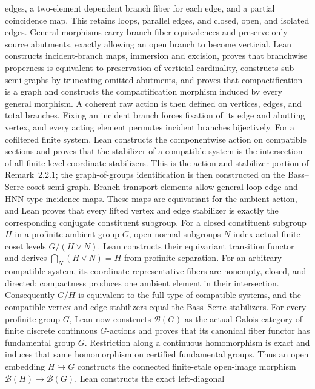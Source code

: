 \begin{definition}
  edges, a two-element dependent branch fiber for each edge, and a partial
  coincidence map.  This retains loops, parallel edges, and closed, open, and
  isolated edges.  General morphisms carry branch-fiber equivalences and
  preserve only source abutments, exactly allowing an open branch to become
  verticial.  Lean constructs incident-branch maps, immersion and excision,
  proves that branchwise properness is equivalent to preservation of verticial
  cardinality, constructs sub-semi-graphs by truncating omitted abutments, and
  proves that compactification is a graph and constructs the compactification
  morphism induced by every general morphism.
  A coherent raw action is then defined on vertices, edges, and total branches.
  Fixing an incident branch forces fixation of its edge and abutting vertex,
  and every acting element permutes incident branches bijectively.  For a
  cofiltered finite system, Lean constructs the componentwise action on
  compatible sections and proves that the stabilizer of a compatible system is
  the intersection of all finite-level coordinate stabilizers.  This is the
  action-and-stabilizer portion of Remark~2.2.1; the graph-of-groups
  identification is then constructed on the Bass--Serre coset semi-graph.
  Branch transport elements allow general loop-edge and HNN-type incidence
  maps.  These maps are equivariant for the ambient action, and Lean proves
  that every lifted vertex and edge stabilizer is exactly the corresponding
  conjugate constituent subgroup.  For a closed constituent subgroup $H$ in a
  profinite ambient group $G$, open normal subgroups $N$ index actual finite
  coset levels $G/(H\vee N)$.  Lean constructs their equivariant transition
  functor and derives $\bigcap_N(H\vee N)=H$ from profinite separation.  For
  an arbitrary compatible system, its coordinate representative fibers are
  nonempty, closed, and directed; compactness produces one ambient element in
  their intersection.  Consequently $G/H$ is equivalent to the full type of
  compatible systems, and the compatible vertex and edge stabilizers equal
  the Bass--Serre stabilizers.
  For every profinite group $G$, Lean now constructs $\mathcal B(G)$ as the
  actual Galois category of finite discrete continuous $G$-actions and proves
  that its canonical fiber functor has fundamental group $G$.  Restriction
  along a continuous homomorphism is exact and induces that same homomorphism
  on certified fundamental groups.  Thus an open embedding $H\hookrightarrow
  G$ constructs the connected finite-etale open-image morphism
  $\mathcal B(H)\to\mathcal B(G)$.  Lean constructs the exact left-diagonal

\end{definition}
